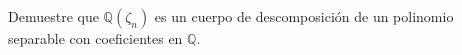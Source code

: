 Demuestre que $\mathbb{Q}(\zeta_{n})$ es un cuerpo de descomposición de un polinomio separable con coeficientes en $\mathbb{Q}$.
